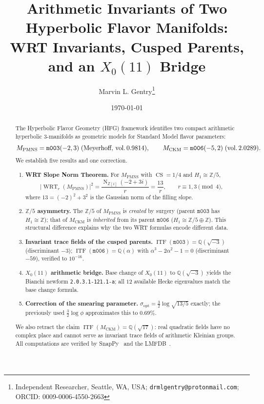 \documentclass[11pt,a4paper]{article}
\theoremstyle{definition}
\newcommand{\Z}{\mathbb{Z}}
\newcommand{\Q}{\mathbb{Q}}
\newcommand{\mfld}[1]{\texttt{#1}}
\newcommand{\WRT}{\operatorname{WRT}}
\newcommand{\CS}{\operatorname{CS}}
\newcommand{\ITF}{\operatorname{ITF}}
\newcommand{\N}{\operatorname{N}}
\begin{document}
\title{Arithmetic Invariants of Two Hyperbolic Flavor Manifolds:\\
WRT Invariants, Cusped Parents, and an $X_0(11)$ Bridge}

\author{Marvin L. Gentry\thanks{Independent Researcher, Seattle, WA,
USA; \texttt{drmlgentry@protonmail.com}; ORCID: 0009-0006-4550-2663}}
\date{\today}
\maketitle

\begin{abstract}
The Hyperbolic Flavor Geometry (HFG) framework identifies two compact
arithmetic hyperbolic 3-manifolds as geometric models for Standard Model
flavor parameters:
\[
M_{\mathrm{PMNS}} = \mfld{m003}(-2,3)\;\text{(Meyerhoff, vol.\,$0.9814$)},
\qquad
M_{\mathrm{CKM}} = \mfld{m006}(-5,2)\;\text{(vol.\,$2.0289$)}.
\]
We establish five results and one correction.
\begin{enumerate}
\item \textbf{WRT Slope Norm Theorem.} For $M_{\mathrm{PMNS}}$ with
  $\CS=1/4$ and $H_1\cong\Z/5$,
  \[
  |\WRT_r(M_{\mathrm{PMNS}})|^2 = \frac{\N_{\Z[i]}(-2+3i)}{r}
  = \frac{13}{r},\qquad r\equiv1,3\pmod4,
  \]
  where $13=(-2)^2+3^2$ is the Gaussian norm of the filling slope.
\item \textbf{$\Z/5$ asymmetry.} The $\Z/5$ of $M_{\mathrm{PMNS}}$ is
  \emph{created} by surgery (parent $\mfld{m003}$ has $H_1\cong\Z$);
  that of $M_{\mathrm{CKM}}$ is \emph{inherited} from its parent
  $\mfld{m006}$ ($H_1\cong\Z/5\oplus\Z$). This structural difference
  explains why the two WRT formulas encode different data.
\item \textbf{Invariant trace fields of the cusped parents.}
  $\ITF(\mfld{m003})=\Q(\sqrt{-3})$ (discriminant $-3$);
  $\ITF(\mfld{m006})=\Q(\alpha)$ with $\alpha^3-2\alpha^2-1=0$
  (discriminant $-59$), verified to $10^{-16}$.
\item \textbf{$X_0(11)$ arithmetic bridge.} Base change of $X_0(11)$
  to $\Q(\sqrt{-3})$ yields the Bianchi newform \texttt{2.0.3.1-121.1-a};
  all $12$ available Hecke eigenvalues match the base change formula.
\item \textbf{Correction of the smearing parameter.}
  $\sigma_{\mathrm{opt}} = \tfrac32\log\sqrt{13/5}$ exactly; the
  previously used $\tfrac32\log\phi$ approximates this to $0.69\%$.
\end{enumerate}
We also retract the claim $\ITF(M_{\mathrm{CKM}})=\Q(\sqrt{17})$:
real quadratic fields have no complex place and cannot serve as
invariant trace fields of arithmetic Kleinian groups.
All computations are verified by SnapPy~\cite{SnapPy} and the
LMFDB~\cite{LMFDB}.
\end{abstract}
\end{document}
